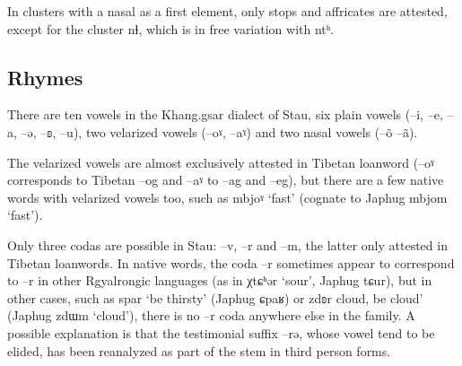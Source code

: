 \documentclass[oneside,a4paper,11pt]{article}
\newcommand{\ipa}[1]{{\phon #1}} %
\begin{document}
 In clusters with a nasal as a first element, only stops and affricates are attested, except for the cluster \ipa{nɬ}, which is in free variation with \ipa{ntʰ}.
 
  \subsection{Rhymes}
 
There are ten vowels in the Khang.gsar dialect of Stau, six plain vowels (--\ipa{i}, --\ipa{e}, --\ipa{a}, --\ipa{ə}, --\ipa{ʚ},  --\ipa{u}), two velarized vowels (--\ipa{oˠ}, --\ipa{aˠ}) and two nasal vowels (--\ipa{õ}   --\ipa{ã}).

The velarized vowels are almost exclusively attested in Tibetan loanword (--\ipa{oˠ} corresponds to Tibetan \ipa{--og} and --\ipa{aˠ} to \ipa{--ag} and \ipa{--eg}), but there are a few native words with velarized vowels too, such as \ipa{mbjoˠ} `fast' (cognate to Japhug \ipa{mbjom} `fast').

Only three codas are possible in Stau: \ipa{--v},  \ipa{--r} and  \ipa{--m}, the latter only attested in Tibetan loanwords. In native words, the coda \ipa{--r} sometimes appear to correspond  to \ipa{--r} in other Rgyalrongic languages (as in \ipa{χtɕʰər} `sour', Japhug \ipa{tɕur}), but in other cases, such as \ipa{spar} `be thirsty' (Japhug \ipa{ɕpaʁ}) or \ipa{zdʚr}  cloud, be cloud' (Japhug \ipa{zdɯm} `cloud'), there is no \ipa{--r} coda anywhere else in the family. A possible explanation is that the testimonial suffix \ipa{--rə}, whose vowel tend to be elided, has been reanalyzed as part of the stem in third person forms.
\end{document}
